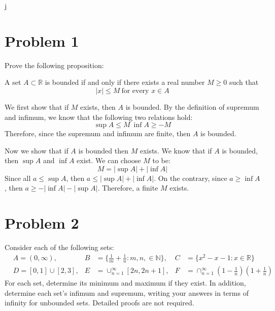 \documentclass[10pt]{article}
\begin{document}
j    \section*{Problem 1}

    Prove the following proposition: 
    
    \begin{prop}
        A set $A \subset \mathbb R$ is 
        bounded if and only if there exists a real number $M \ge 0$ such that 
        \[ |x| \le M \ \text{for every $x \in A$}\]
    \end{prop}

    \begin{solution}
        We first show that if $M$ exists, then $A$ is bounded. By the definition of supremum and infimum, we know that the following two relations hold:
        \[ \sup A \le M \ \inf A \ge -M\]
        Therefore, since the supremum and infimum are finite, then $A$ is bounded. 

        Now we show that if $A$ is bounded then $M$ exists. We know that if $A$ is bounded, then $\sup A$ and $\inf A$ exist. We can choose $M$ to be:
        \[ M = |\sup A| + |\inf A|\]
        Since all $a \le \sup A$, then $a \le |\sup A| + |\inf A|$. On the contrary, since $a \ge \inf A$, then $a \ge -|\inf A| - |\sup A|$. Therefore, a finite $M$ exists.
    \end{solution}
    \pagebreak
    \section*{Problem 2}
    Consider each of the following sets: 
    \begin{align*}
        &A = (0, \infty), \ &B &= \{ \frac{1}{m} + \frac{1}{n}: m, n, \in \mathbb N\}, & C &= \{x^2 - x - 1: x \in \mathbb R\}\\
        &D = [0, 1] \cup [2, 3], &E &= \cup_{n = 1}^{\infty} [2n, 2n+1], &F &= \cap_{n = 1}^\infty (1 - \frac 1n)(1 + \frac 1n)
    \end{align*}
    For each set, determine its minimum and maximum if they exist. In addition, determine each set's infimum and supremum, writing your answers in terms of infinity for unbounded sets. Detailed proofs are not required. 
\end{document}
